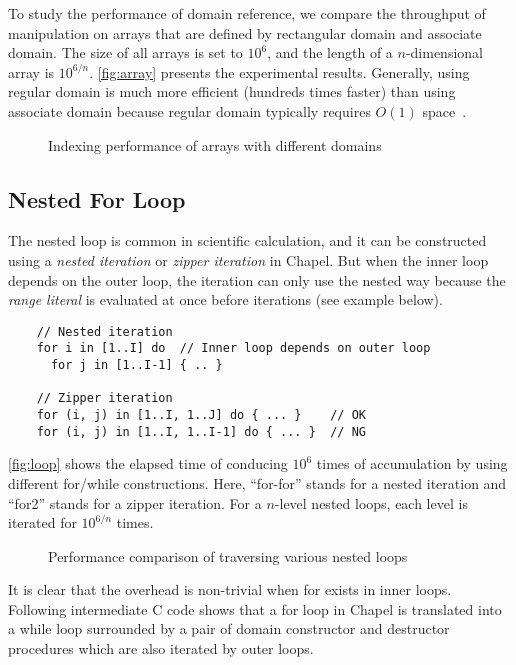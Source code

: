 To study the performance of domain reference, we compare the throughput of
manipulation on arrays that are defined by rectangular domain and associate
domain. The size of all arrays is set to $10^6$, and the length of a
$n$-dimensional array is $10^{6/n}$. \autoref{fig:array} presents the
experimental results. Generally, using regular domain is much more efficient
(hundreds times faster) than using associate domain because regular domain
typically requires $O(1)$ space~\cite{chapelspec}.
\begin{figure}[t]
\centering

\caption{Indexing performance of arrays with different domains}
\label{fig:array}
\end{figure}

\subsection{Nested For Loop}\label{sec:nested_loop}
The nested loop is common in scientific calculation, and it can be constructed
using a {\em nested iteration} or {\em zipper iteration} in Chapel. But when the
inner loop depends on the outer loop, the iteration can only use the nested way
because the {\em range literal} is evaluated at once before iterations (see
example below).
\begin{lstlisting}
    // Nested iteration
    for i in [1..I] do  // Inner loop depends on outer loop
      for j in [1..I-1] { .. } 

    // Zipper iteration
    for (i, j) in [1..I, 1..J] do { ... }    // OK
    for (i, j) in [1..I, 1..I-1] do { ... }  // NG
\end{lstlisting}

\autoref{fig:loop} shows the elapsed time of conducing $10^6$ times of
accumulation by using different {\ic for}/{\ic while} constructions. Here,
``{\ic for-for}'' stands for a nested iteration and ``{\ic for2}'' stands for a
zipper iteration. For a $n$-level nested loops, each level is iterated for
$10^{6/n}$ times.
\begin{figure*}[t]
\centering

\caption{Performance comparison of traversing various nested loops}
\label{fig:loop}
\end{figure*}

It is clear that the overhead is non-trivial when {\ic for} exists in inner
loops. Following intermediate C code shows that a {\ic for} loop in Chapel is
translated into a {\ic while} loop surrounded by a pair of domain constructor
and destructor procedures which are also iterated by outer loops.


